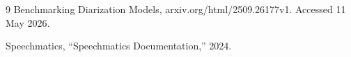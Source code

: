 \documentclass{article}
\begin{document}
\pagebreak
\begin{thebibliography}{9}
Benchmarking Diarization Models, arxiv.org/html/2509.26177v1. Accessed 11 May 2026. 

Speechmatics, ``Speechmatics Documentation,'' 2024.
\end{thebibliography}
\end{document}
